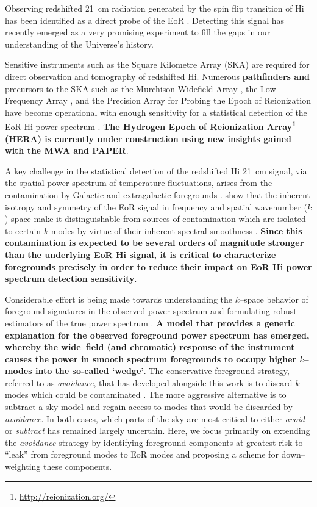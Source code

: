 \documentclass[preprint2,iop,numberedappendix,twocolappendix,appendixfloats]{emulateapj}
\begin{document}
Observing redshifted 21~cm radiation generated by the spin flip transition of H{\sc i} has been identified as a direct probe of the EoR \citep{sun72,sco90,mad97,toz00,ili02}. Detecting this signal has recently emerged as a very promising experiment to fill the gaps in our understanding of the Universe's history.  

Sensitive instruments such as the Square Kilometre Array (SKA) are required for direct observation and tomography of redshifted H{\sc i}. Numerous {\bf pathfinders and} precursors to the SKA such as the Murchison Widefield Array \citep[MWA;][]{lon09,tin13,bow13}, the Low Frequency Array \citep[LOFAR;][]{van13}, and the Precision Array for Probing the Epoch of Reionization \citep[PAPER;][]{par10} have become operational with enough sensitivity for a statistical detection of the EoR H{\sc i} power spectrum \citep{bow06,par12a,bea13,dil13,thy13,pob14}. {\bf The Hydrogen Epoch of Reionization Array\footnote{\url{http://reionization.org/}} (HERA) is currently under construction using new insights gained with the MWA and PAPER}.

A key challenge in the statistical detection of the redshifted H{\sc i} 21~cm signal, via the spatial power spectrum of temperature fluctuations, arises from the contamination by Galactic and extragalactic foregrounds \citep[see, e.g.,][]{dim02,zal04,fur06,ali08,ber09,ber10,gho12}. \citet{mor04} show that the inherent isotropy and symmetry of the EoR signal in frequency and spatial wavenumber ($k$) space make it distinguishable from sources of contamination which are isolated to certain $k$ modes by virtue of their inherent spectral smoothness \citep{mor06,bow09,liu11,par12b,dil13,pob13}. {\bf Since this contamination is expected to be several orders of magnitude stronger than the underlying EoR H{\sc i} signal, it is critical to characterize foregrounds precisely in order to reduce their impact on EoR H{\sc i} power spectrum detection sensitivity}. 

Considerable effort is being made towards understanding the $k$--space behavior of foreground signatures in the observed power spectrum and formulating robust estimators of the true power spectrum \citep{bow09,liu09,dat10,liu11,mor12,tro12,pob13,thy13,dil14,liu14a,liu14b}. {\bf A model that provides a generic explanation for the observed foreground power spectrum has emerged, whereby the wide--field (and chromatic) response of the instrument causes the power in smooth spectrum foregrounds to occupy higher $k$--modes into the so-called `wedge'}. The conservative foreground strategy, referred to as {\it avoidance}, that has developed alongside this work is to discard $k$--modes which could be contaminated \citep[e.g.,][]{par14}. The more aggressive alternative is to subtract a sky model and regain access to modes that would be discarded by {\it avoidance}. In both cases, which parts of the sky are most critical to either {\it avoid} or {\it subtract} has remained largely uncertain. Here, we focus primarily on extending the {\it avoidance} strategy by identifying foreground components at greatest risk to ``leak'' from foreground modes to EoR modes and proposing a scheme for down--weighting these components.
\end{document}
